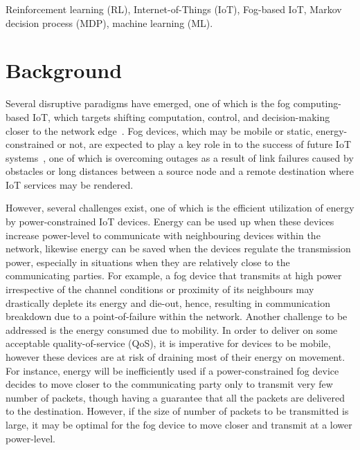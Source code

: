 \documentclass[journal]{IEEEtran}
\begin{document}
\begin{IEEEkeywords}
Reinforcement learning (RL), Internet-of-Things (IoT), Fog-based IoT, Markov decision process (MDP), machine learning (ML).
\end{IEEEkeywords}






%
\IEEEpeerreviewmaketitle

\section{Background}
Several disruptive paradigms have emerged, one of which is the fog computing-based IoT, which targets shifting computation, control, and decision-making closer to the network edge~\cite{Omoniwa2018}. Fog devices, which may be mobile or static, energy-constrained or not, are expected to play a key role in to the success of future IoT systems~\cite{Chiangh2016}, one of which is overcoming outages as a result of link failures caused by obstacles or long distances between a source node and a remote destination where IoT services may be rendered.

However, several challenges exist, one of which is the efficient utilization of energy by power-constrained IoT devices. Energy can be used up when these devices increase power-level to communicate with neighbouring devices within the network, likewise energy can be saved when the devices regulate the transmission power, especially in situations when they are relatively close to the communicating parties. For example, a fog device that transmits at high power irrespective of the channel conditions or proximity of its neighbours may drastically deplete its energy and die-out, hence, resulting in communication breakdown due to a point-of-failure within the network. Another challenge to be addressed is the energy consumed due to mobility. In order to deliver on some acceptable quality-of-service (QoS), it is imperative for devices to be mobile, however these devices are at risk of draining most of their energy on movement. For instance, energy will be inefficiently used if a power-constrained fog device decides to move closer to the communicating party only to transmit very few number of packets, though having a guarantee that all the packets are delivered to the destination. However, if the size of number of packets to be transmitted is large, it may be optimal for the fog device to move closer and transmit at a lower power-level.
\end{document}
